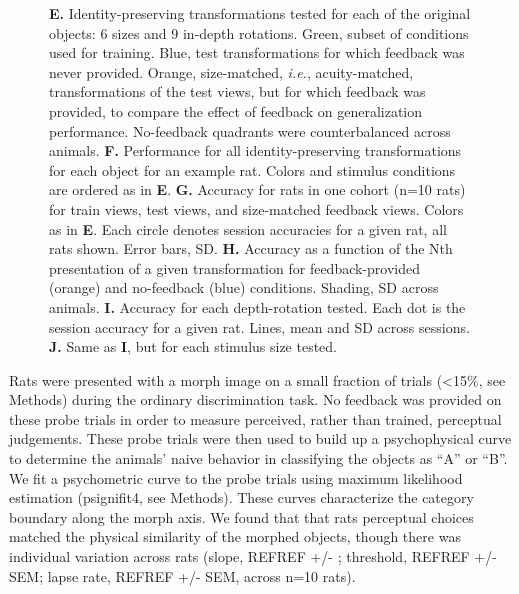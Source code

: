 \begin{figure}[t!]
{    \textbf{E.} Identity-preserving transformations tested for each of the original objects: 6 sizes and 9 in-depth rotations. Green, subset of conditions used for training. Blue, test transformations for which feedback was never provided. Orange, size-matched, \textit{i.e.}, acuity-matched, transformations of the test views, but for which feedback was provided, to compare the effect of feedback on generalization performance. No-feedback quadrants were counterbalanced across animals. 
    \textbf{F.} Performance for all identity-preserving transformations for each object for an example rat. Colors and stimulus conditions are ordered as in \textbf{E}. \textbf{G.} Accuracy for rats in one cohort (n=10 rats) for train views, test views, and size-matched feedback views. Colors as in \textbf{E}. Each circle denotes session accuracies for a given rat, all rats shown. Error bars, SD. 
    \textbf{H.} Accuracy as a function of the Nth presentation of a given transformation for feedback-provided (orange) and no-feedback (blue) conditions. Shading, SD across animals. 
    \textbf{I.} Accuracy for each depth-rotation tested. Each dot is the session accuracy for a given rat. Lines, mean and SD across sessions. 
    \textbf{J.} Same as \textbf{I}, but for each stimulus size tested. 
    \label{fig:behavior_generalization}}
\end{figure}

Rats were presented with a morph image on a small fraction of trials (<15\%, see Methods) during the ordinary discrimination task. No feedback was provided on these probe trials in order to measure perceived, rather than trained, perceptual judgements. These probe trials were then used to build up a psychophysical curve to determine the animals' naive behavior in classifying the objects as ``A'' or ``B''. We fit a psychometric curve to the probe trials using maximum likelihood estimation (psignifit4, see Methods). These curves characterize the category boundary along the morph axis. We found that that rats perceptual choices matched the physical similarity of the morphed objects, though there was individual variation across rats (slope, REFREF +/- ; threshold, REFREF +/- SEM; lapse rate, REFREF +/- SEM, across n=10 rats). 


